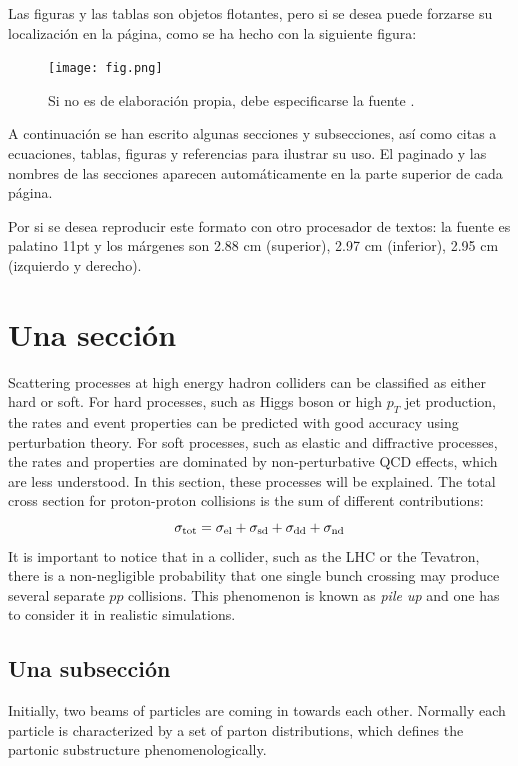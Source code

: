 \documentclass[11pt,a4paper,twoside,pdf]{article}
\numberwithin{equation}{section}
\begin{document}
Las figuras y las tablas son objetos flotantes, pero si se desea puede forzarse su localización en la página, como se ha hecho con la siguiente figura:

\begin{figure}[h]
\centering
\texttt{[image: fig.png]}				
\caption{Si no es de elaboración propia, debe especificarse la fuente \cite{PYTHIA}. \label{figura1}}
\end{figure}
\noindent

A continuación se han escrito algunas secciones y subsecciones, así como citas a ecuaciones, tablas, figuras y referencias para ilustrar su uso. El paginado y las nombres de las secciones aparecen automáticamente en la parte superior de cada página. 

Por si se desea reproducir este formato con otro procesador de textos: la fuente es palatino 11pt y los márgenes son 2.88 cm (superior), 2.97 cm (inferior), 2.95 cm (izquierdo y derecho).


\section{Una sección}

Scattering processes at high energy hadron colliders can be classified as either hard or soft. For hard processes, such as Higgs boson or high $p_{T}$ jet production, the rates and event properties can be predicted with good accuracy using perturbation theory.
For soft processes, such as elastic and diffractive processes, the rates and properties are dominated by non-perturbative QCD effects, which are less understood. In this section, these processes will be explained. The total cross section for proton-proton collisions is the sum of different contributions:
\begin{equation}
\sigma_{\rm tot}=\sigma_{\rm el}+\sigma_{\rm sd}+\sigma_{\rm dd}+\sigma_{\rm nd}
\end{equation}
It is important to notice that in a collider, such as the LHC or the Tevatron, there is a non-negligible probability that one single bunch crossing may produce several separate $pp$ collisions. This phenomenon is known as {\em pile up} and one has to consider it in realistic simulations.

\subsection{Una subsección}

Initially, two beams of particles are coming in towards each other. Normally each particle is characterized by a set of parton distributions, which defines the partonic substructure phenomenologically.
\end{document}
